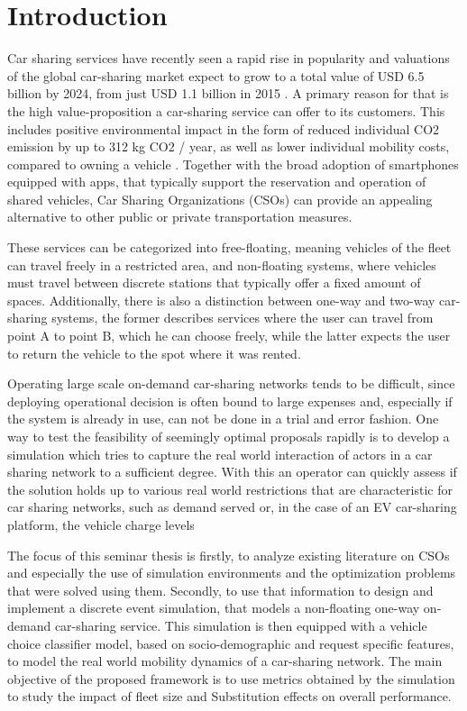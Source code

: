 \clearpage
\section{Introduction}
\label{sec:Intro}

Car sharing services have recently seen a rapid rise in popularity 
and valuations of the global car-sharing market expect to grow to
a total value of USD 6.5 billion by 2024, from just USD 1.1 billion in 2015 . 
A primary reason for that is the high value-proposition a car-sharing service
can offer to its customers. This includes positive environmental impact in the form of
reduced individual CO2 emission by up to 312 kg CO2 / year, as well as
lower individual mobility costs, compared to owning a vehicle . Together with the
broad adoption of smartphones equipped with apps, that typically
support the reservation and operation of shared vehicles, Car Sharing Organizations (CSOs)
can provide an appealing alternative to other public or private transportation measures.

These services can be categorized into free-floating, meaning vehicles of the fleet
can travel freely in a restricted area, and non-floating systems, where vehicles must travel
between discrete stations that typically offer a fixed amount of spaces. Additionally,
there is also a distinction between one-way and two-way car-sharing systems, the former
describes services where the user can travel from point A to point B, which he can choose
freely, while the latter expects the user to return the vehicle to the spot where it was
rented.

Operating large scale on-demand car-sharing networks tends to be difficult, since
deploying operational decision is often bound to large expenses and, especially if the
system is already in use, can not be done in a trial and error fashion. One way to test the feasibility of
seemingly optimal proposals rapidly is to develop a simulation which tries to capture the real world
interaction of actors in a car sharing network to a sufficient degree. With this an operator can 
quickly assess if the solution holds up to various real world restrictions that are characteristic
for car sharing networks, such as demand served or, in the case of an EV car-sharing platform, the vehicle
charge levels 

The focus of this seminar thesis is firstly, to analyze existing literature on CSOs and especially
the use of simulation environments and the optimization problems that were solved using them.
Secondly, to use that information to design
and implement a discrete event simulation, that models a non-floating one-way on-demand
car-sharing service. This simulation is then equipped with a vehicle choice
classifier model, based on socio-demographic and request specific features,
to model the real world mobility dynamics of a car-sharing network.
The main objective of the proposed framework is to use metrics obtained by the simulation
to study the impact of fleet size and Substitution effects on overall performance.
